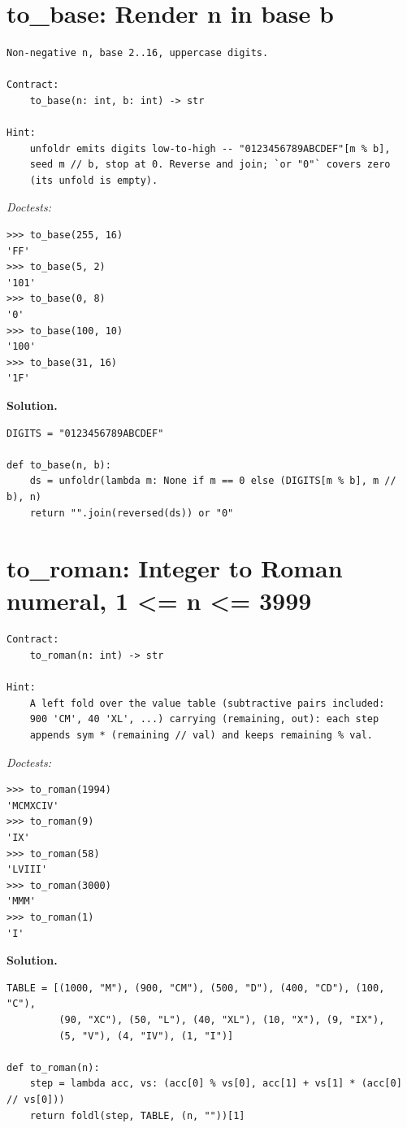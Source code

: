 \documentclass[11pt,letterpaper]{book}
\begin{document}
\section{to\_base: Render n in base b}
\begin{lstlisting}[style=spec]
Non-negative n, base 2..16, uppercase digits.

Contract:
    to_base(n: int, b: int) -> str

Hint:
    unfoldr emits digits low-to-high -- "0123456789ABCDEF"[m % b],
    seed m // b, stop at 0. Reverse and join; `or "0"` covers zero
    (its unfold is empty).
\end{lstlisting}
\noindent\textit{Doctests:}
\begin{lstlisting}[style=spec]
>>> to_base(255, 16)
'FF'
>>> to_base(5, 2)
'101'
>>> to_base(0, 8)
'0'
>>> to_base(100, 10)
'100'
>>> to_base(31, 16)
'1F'
\end{lstlisting}
\noindent\textbf{Solution.}
\begin{lstlisting}[style=code]
DIGITS = "0123456789ABCDEF"

def to_base(n, b):
    ds = unfoldr(lambda m: None if m == 0 else (DIGITS[m % b], m // b), n)
    return "".join(reversed(ds)) or "0"
\end{lstlisting}

\section{to\_roman: Integer to Roman numeral, 1 <= n <= 3999}
\begin{lstlisting}[style=spec]
Contract:
    to_roman(n: int) -> str

Hint:
    A left fold over the value table (subtractive pairs included:
    900 'CM', 40 'XL', ...) carrying (remaining, out): each step
    appends sym * (remaining // val) and keeps remaining % val.
\end{lstlisting}
\noindent\textit{Doctests:}
\begin{lstlisting}[style=spec]
>>> to_roman(1994)
'MCMXCIV'
>>> to_roman(9)
'IX'
>>> to_roman(58)
'LVIII'
>>> to_roman(3000)
'MMM'
>>> to_roman(1)
'I'
\end{lstlisting}
\noindent\textbf{Solution.}
\begin{lstlisting}[style=code]
TABLE = [(1000, "M"), (900, "CM"), (500, "D"), (400, "CD"), (100, "C"),
         (90, "XC"), (50, "L"), (40, "XL"), (10, "X"), (9, "IX"),
         (5, "V"), (4, "IV"), (1, "I")]

def to_roman(n):
    step = lambda acc, vs: (acc[0] % vs[0], acc[1] + vs[1] * (acc[0] // vs[0]))
    return foldl(step, TABLE, (n, ""))[1]
\end{lstlisting}
\end{document}
